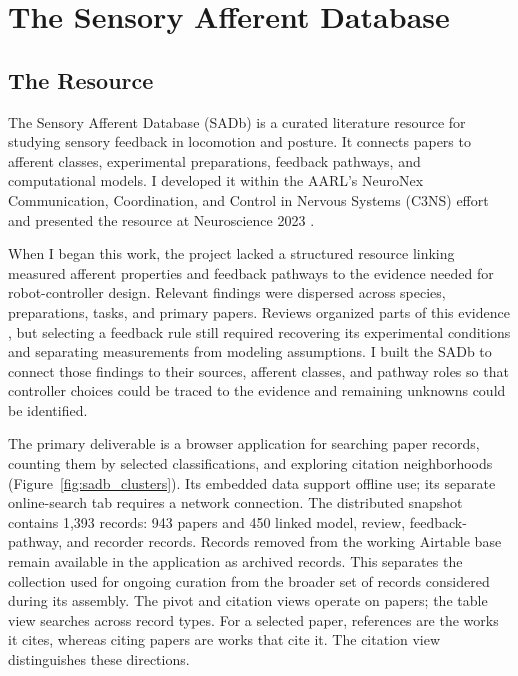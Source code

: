 \chapter{The Sensory Afferent Database}\label{ch:database}
\graphicspath{{figs/50-database/}}

\section{The Resource}\label{sec:sadb_resource}

The Sensory Afferent Database (SADb) is a curated literature resource for studying sensory feedback in locomotion and posture. It connects papers to afferent classes, experimental preparations, feedback pathways, and computational models. I developed it within the AARL's NeuroNex Communication, Coordination, and Control in Nervous Systems (C3NS) effort and presented the resource at Neuroscience 2023 \citep{bolen_sensory_2023}.

When I began this work, the project lacked a structured resource linking measured afferent properties and feedback pathways to the evidence needed for robot-controller design. Relevant findings were dispersed across species, preparations, tasks, and primary papers. Reviews organized parts of this evidence \citep{van_de_crommert_review_1998, windhorst_muscle_2007, windhorst_spinal_2022}, but selecting a feedback rule still required recovering its experimental conditions and separating measurements from modeling assumptions. I built the SADb to connect those findings to their sources, afferent classes, and pathway roles so that controller choices could be traced to the evidence and remaining unknowns could be identified.

The primary deliverable is a browser application for searching paper records, counting them by selected classifications, and exploring citation neighborhoods (Figure~\ref{fig:sadb_clusters}). Its embedded data support offline use; its separate online-search tab requires a network connection. The distributed snapshot contains 1,393 records: 943 papers and 450 linked model, review, feedback-pathway, and recorder records. Records removed from the working Airtable base remain available in the application as archived records. This separates the collection used for ongoing curation from the broader set of records considered during its assembly. The pivot and citation views operate on papers; the table view searches across record types. For a selected paper, references are the works it cites, whereas citing papers are works that cite it. The citation view distinguishes these directions.

